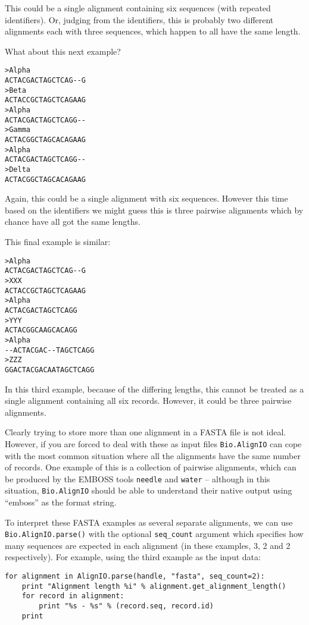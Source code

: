 \documentclass{report}
\begin{document}
\noindent This could be a single alignment containing six sequences (with repeated identifiers).  Or, judging from the identifiers, this is probably two different alignments each with three sequences, which happen to all have the same length.

What about this next example?

\begin{verbatim}
>Alpha
ACTACGACTAGCTCAG--G
>Beta
ACTACCGCTAGCTCAGAAG
>Alpha
ACTACGACTAGCTCAGG--
>Gamma
ACTACGGCTAGCACAGAAG
>Alpha
ACTACGACTAGCTCAGG--
>Delta
ACTACGGCTAGCACAGAAG
\end{verbatim}

\noindent Again, this could be a single alignment with six sequences.  However this time based on the identifiers we might guess this is three pairwise alignments which by chance have all got the same lengths.

This final example is similar:

\begin{verbatim}
>Alpha
ACTACGACTAGCTCAG--G
>XXX
ACTACCGCTAGCTCAGAAG
>Alpha
ACTACGACTAGCTCAGG
>YYY
ACTACGGCAAGCACAGG
>Alpha
--ACTACGAC--TAGCTCAGG
>ZZZ
GGACTACGACAATAGCTCAGG
\end{verbatim}

\noindent In this third example, because of the differing lengths, this cannot be treated as a single alignment containing all six records.  However, it could be three pairwise alignments.

Clearly trying to store more than one alignment in a FASTA file is not ideal.  However, if you are forced to deal with these as input files \verb|Bio.AlignIO| can cope with the most common situation where all the alignments have the same number of records.
One example of this is a collection of pairwise alignments, which can be produced by the EMBOSS tools \verb|needle| and \verb|water| -- although in this situation, \verb|Bio.AlignIO| should be able to understand their native output using ``emboss'' as the format string.

To interpret these FASTA examples as several separate alignments, we can use \verb|Bio.AlignIO.parse()| with the optional \verb|seq_count| argument which specifies how many sequences are expected in each alignment (in these examples, 3, 2 and 2 respectively).
For example, using the third example as the input data:

\begin{verbatim}
for alignment in AlignIO.parse(handle, "fasta", seq_count=2):
    print "Alignment length %i" % alignment.get_alignment_length()
    for record in alignment:
        print "%s - %s" % (record.seq, record.id)
    print
\end{verbatim}
\end{document}
